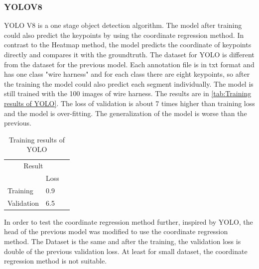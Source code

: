 \subsubsection{YOLOV8}
	YOLO V8 is a one stage object detection algorithm. The model after training could also predict the keypoints by using the coordinate regression method.
	In contrast to the Heatmap method, the model predicts the coordinate of keypoints directly and compares it with the groundtruth. The dataset for YOLO is 
	different from the dataset for the previous model. Each annotation file is in txt format and has one class "wire harness" and for each class there are eight 
	keypoints, so after the training the model could also predict each segment individually. The model is still trained with the 100 images of wire harness.
	The results are in \autoref{tab:Training results of YOLO}. The loss of validation is about 7 times higher than training loss and the model is over-fitting.
	The generalization of the model is worse than the previous. \\
	\begin{table}[htb]
		\centering
		\begin{tabular}{@{}llr@{}} \toprule
		\multicolumn{2}{c}{Result}             \\ \cmidrule(r){1-2}
					& Loss   \\ \midrule
			Training & 0.9    \\
			Validation& 6.5    \\ \bottomrule
		\end{tabular}
		\caption{Training results of YOLO} 
		\label{tab:Training results of YOLO}
	\end{table}
	In order to test the coordinate regression method further, inspired by YOLO, the head of the previous model was modified to use the coordinate regression method.
	The Dataset is the same and after the training, the validation loss is double of the previous validation loss. At least for small dataset, the coordinate regression
	method is not suitable.
